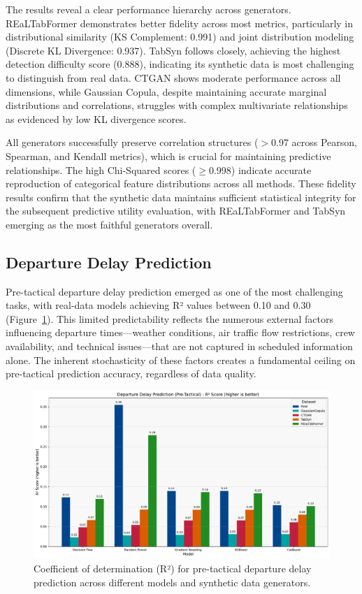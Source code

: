 \documentclass[conference]{IEEEtran}
\begin{document}
The results reveal a clear performance hierarchy across generators. REaLTabFormer demonstrates better fidelity across most metrics, particularly in distributional similarity (KS Complement: 0.991) and joint distribution modeling (Discrete KL Divergence: 0.937). TabSyn follows closely, achieving the highest detection difficulty score (0.888), indicating its synthetic data is most challenging to distinguish from real data. CTGAN shows moderate performance across all dimensions, while Gaussian Copula, despite maintaining accurate marginal distributions and correlations, struggles with complex multivariate relationships as evidenced by low KL divergence scores.

All generators successfully preserve correlation structures ($>$0.97 across Pearson, Spearman, and Kendall metrics), which is crucial for maintaining predictive relationships. The high Chi-Squared scores ($\geq$0.998) indicate accurate reproduction of categorical feature distributions across all methods. These fidelity results confirm that the synthetic data maintains sufficient statistical integrity for the subsequent predictive utility evaluation, with REaLTabFormer and TabSyn emerging as the most faithful generators overall.

\subsection{Departure Delay Prediction}

Pre-tactical departure delay prediction emerged as one of the most challenging tasks, with real-data models achieving R² values between 0.10 and 0.30 (Figure~\ref{fig:departure_r2}). This limited predictability reflects the numerous external factors influencing departure times—weather conditions, air traffic flow restrictions, crew availability, and technical issues—that are not captured in scheduled information alone. The inherent stochasticity of these factors creates a fundamental ceiling on pre-tactical prediction accuracy, regardless of data quality.

\begin{figure}[htbp]
    \centering
    \includegraphics[width=\linewidth]{plots/departure_delay_min_pre-tactical/departure_delay_min_pre-tactical_r2.pdf}
    \caption{Coefficient of determination (R²) for pre-tactical departure delay prediction across different models and synthetic data generators.}
    \label{fig:departure_r2}
\end{figure}
\end{document}
